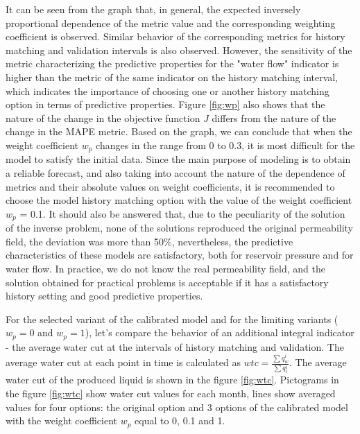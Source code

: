 \documentclass[
11pt,%
tightenlines,%
twoside,%
onecolumn,%
nofloats,%
nobibnotes,%
nofootinbib,%
superscriptaddress,%
noshowpacs,%
centertags]%
{revtex4}
\begin{document}
It can be seen from the graph that, in general, the expected inversely proportional dependence of the metric value and the corresponding weighting coefficient is observed. Similar behavior of the corresponding metrics for history matching and validation intervals is also observed. However, the sensitivity of the metric characterizing the predictive properties for the "water flow" indicator is higher than the metric of the same indicator on the history matching interval, which indicates the importance of choosing one or another history matching option in terms of predictive properties. Figure \ref{fig:wp} also shows that the nature of the change in the objective function $J$ differs from the nature of the change in the MAPE metric. Based on the graph, we can conclude that when the weight coefficient $w_p$ changes in the range from 0 to 0.3, it is most difficult for the model to satisfy the initial data. Since the main purpose of modeling is to obtain a reliable forecast, and also taking into account the nature of the dependence of metrics and their absolute values on weight coefficients, it is recommended to choose the model history matching option with the value of the weight coefficient $w_p$ = 0.1. It should also be answered that, due to the peculiarity of the solution of the inverse problem, none of the solutions reproduced the original permeability field, the deviation was more than 50\%, nevertheless, the predictive characteristics of these models are satisfactory, both for reservoir pressure and for water flow. In practice, we do not know the real permeability field, and the solution obtained for practical problems is acceptable if it has a satisfactory history setting and good predictive properties.

For the selected variant of the calibrated model and for the limiting variants ($w_p = 0$ and $w_p = 1$), let's compare the behavior of an additional integral indicator - the average water cut at the intervals of history matching and validation. The average water cut at each point in time is calculated as $wtc = \frac{\sum{q_w^i}}{\sum{q_l^i}}$. The average water cut of the produced liquid is shown in the figure \ref{fig:wtc}. Pictograms in the figure \ref{fig:wtc} show water cut values for each month, lines show averaged values for four options: the original option and 3 options of the calibrated model with the weight coefficient $w_p$ equal to 0, 0.1 and 1.
\end{document}
